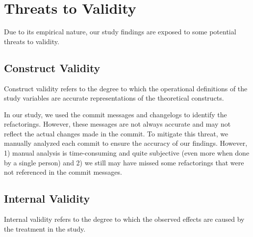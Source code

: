 \documentclass[conference]{IEEEtran}
\begin{document}
\vspace{1em}
\noindent
{}

\vspace{1em}
\noindent
{}

\section{Threats to Validity}

Due to its empirical nature, our study findings are exposed to some potential threats to validity.

\subsection{Construct Validity}

Construct validity refers to the degree to which the operational definitions of the study variables are accurate representations of the theoretical constructs.

In our study, we used the commit messages and changelogs to identify the refactorings. However, these messages are not always accurate and may not reflect the actual changes made in the commit. To mitigate this threat, we manually analyzed each commit to ensure the accuracy of our findings. However, 1) manual analysis is time-consuming and quite subjective (even more when done by a single person) and 2) we still may have missed some refactorings that were not referenced in the commit messages.

\subsection{Internal Validity}

Internal validity refers to the degree to which the observed effects are caused by the treatment in the study.
\end{document}
